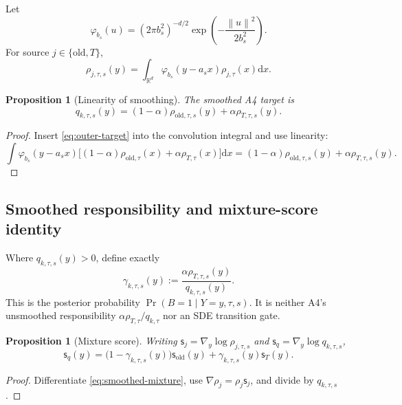 \documentclass[11pt,a4paper]{article}
\newcommand{\R}{\mathbb{R}}
\newcommand{\norm}[1]{\left\lVert #1 \right\rVert}
\newcommand{\dd}{\mathrm{d}}
\newcommand{\old}{\mathrm{old}}
\newcommand{\score}{\mathsf{s}}
\theoremstyle{plain}
\newtheorem{proposition}[theorem]{Proposition}
\theoremstyle{definition}
\begin{document}
Let
\[
\varphi_{b_s}(u)
=(2\pi b_s^2)^{-d/2}\exp\!\left(-\frac{\norm{u}^2}{2b_s^2}\right).
\]
For source $j\in\{\old,T\}$,
\begin{equation}
\rho_{j,\tau,s}(y)
=\int_{\R^d}\varphi_{b_s}(y-a_sx)\rho_{j,\tau}(x)\dd x.
\label{eq:smoothed-source}
\end{equation}

\begin{proposition}[Linearity of smoothing]
\label{prop:smoothing-mixture}
The smoothed A4 target is
\begin{equation}
q_{k,\tau,s}(y)
=(1-\alpha)\rho_{\old,\tau,s}(y)
+\alpha\rho_{T,\tau,s}(y).
\label{eq:smoothed-mixture}
\end{equation}
\end{proposition}

\begin{proof}
Insert \eqref{eq:outer-target} into the convolution integral and use linearity:
\[
\int\varphi_{b_s}(y-a_sx)
\bigl[(1-\alpha)\rho_{\old,\tau}(x)+\alpha\rho_{T,\tau}(x)\bigr]\dd x
=(1-\alpha)\rho_{\old,\tau,s}(y)+\alpha\rho_{T,\tau,s}(y).
\]
\end{proof}

\subsection{Smoothed responsibility and mixture-score identity}

Where $q_{k,\tau,s}(y)>0$, define exactly
\begin{equation}
\boxed{
\gamma_{k,\tau,s}(y)
:=\frac{\alpha\rho_{T,\tau,s}(y)}{q_{k,\tau,s}(y)}
}.
\label{eq:smoothed-gamma}
\end{equation}
This is the posterior probability $\Pr(B=1\mid Y=y,\tau,s)$.  It is neither A4's unsmoothed
responsibility $\alpha\rho_{T,\tau}/q_{k,\tau}$ nor an SDE transition gate.

\begin{proposition}[Mixture score]
\label{prop:mixture-score}
Writing $\score_j=\nabla_y\log\rho_{j,\tau,s}$ and
$\score_q=\nabla_y\log q_{k,\tau,s}$,
\begin{equation}
\boxed{
\score_q(y)
=\bigl(1-\gamma_{k,\tau,s}(y)\bigr)\score_{\old}(y)
+\gamma_{k,\tau,s}(y)\score_T(y)
}.
\label{eq:mixture-score}
\end{equation}
\end{proposition}

\begin{proof}
Differentiate \eqref{eq:smoothed-mixture}, use
$\nabla\rho_j=\rho_j\score_j$, and divide by $q_{k,\tau,s}$.
\end{proof}
\end{document}
